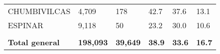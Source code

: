\begin{tabular}{llllll}
	\cellcolor[HTML]{F8CBAD}CHUMBIVILCAS                           & 4,709                                                                 & 178                                                              & 42.7                                                                             & 37.6                                                                        & 13.1                                                                                \\
	\cellcolor[HTML]{F8CBAD}ESPINAR                                & 9,118                                                                 & 50                                                               & 23.2                                                                             & 30.0                                                                        & 10.6                                                                                \\
	&                                                                       &                                                                  &                                                                                  &                                                                             &                                                                                     \\
	\rowcolor[HTML]{DDEBF7} 
	\textbf{Total   general}                                       & \textbf{198,093}                                                      & \textbf{39,649}                                                  & \textbf{38.9}                                                                    & \textbf{33.6}                                                               & \textbf{16.7}                                                                      
\end{tabular}